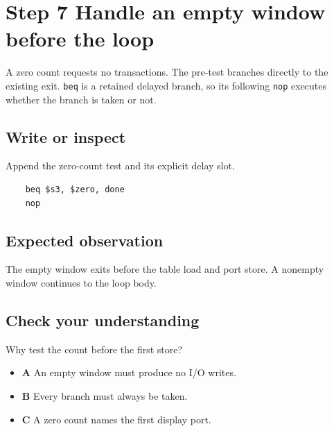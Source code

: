 \section{Step 7 Handle an empty window before the
  loop}\label{005-seven-segment-counter-s07-step-7-handle-an-empty-window-before-the-loop}

A zero count requests no transactions. The pre-test branches directly to
the existing exit. \texttt{beq} is a retained delayed branch, so its
following \texttt{nop} executes whether the branch is taken or not.

\subsection{Write or
  inspect}\label{005-seven-segment-counter-s07-write-or-inspect}

Append the zero-count test and its explicit delay slot.

\begin{verbatim}
    beq $s3, $zero, done
    nop
\end{verbatim}

\subsection{Expected
  observation}\label{005-seven-segment-counter-s07-expected-observation}

The empty window exits before the table load and port store. A nonempty
window continues to the loop body.

\subsection{Check your
  understanding}\label{005-seven-segment-counter-s07-check-your-understanding}

Why test the count before the first store?

\begin{itemize}
  \tightlist
  \item
        \textbf{A} An empty window must produce no I/O writes.
  \item
        \textbf{B} Every branch must always be taken.
  \item
        \textbf{C} A zero count names the first display port.
\end{itemize}
